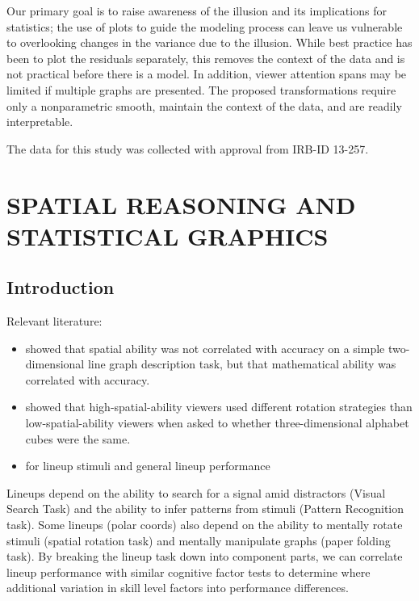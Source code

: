 \documentclass[11pt]{isuthesis}\usepackage[]{graphicx}\usepackage[]{color}
\begin{document}
Our primary goal is to raise awareness of the illusion and its implications for statistics; the use of plots to guide the modeling process can leave us vulnerable to overlooking changes in the variance due to the illusion. While best practice has  been to plot the residuals separately, this removes the context of the data and is not practical before there is a model. In addition, viewer attention spans may be limited if multiple graphs are presented. The proposed transformations require only a nonparametric smooth, maintain the context of the data, and are readily interpretable. 

The data for this study was collected with approval from  IRB-ID 13-257.




\graphicspath{{Figure/VisualAptitude/}{Images/VisualAptitude/}}
\renewcommand{\floatpagefraction}{.99}






\chapter{SPATIAL REASONING AND STATISTICAL GRAPHICS}\label{VisualAptitude}\label{visualreasoning}

\section{Introduction}
Relevant literature: 
\begin{itemize}
\item \citet{shah1995conceptual} showed that spatial ability was not correlated with accuracy on a simple two-dimensional line graph description task, but that mathematical ability was correlated with accuracy. 
\item \citet{just1985cognitive} showed that high-spatial-ability viewers used different rotation strategies than low-spatial-ability viewers when asked to whether three-dimensional alphabet cubes were the same. 
\item \citet{hofmann2012graphical} for lineup stimuli and general lineup performance
\end{itemize}

Lineups depend on the ability to search for a signal amid distractors (Visual Search Task) and the ability to infer patterns from stimuli (Pattern Recognition task). Some lineups (polar coords) also depend on the ability to mentally rotate stimuli (spatial rotation task) and mentally manipulate graphs (paper folding task). By breaking the lineup task down into component parts, we can correlate lineup performance with similar cognitive factor tests to determine where additional variation in skill level factors into performance differences. 
\end{document}
